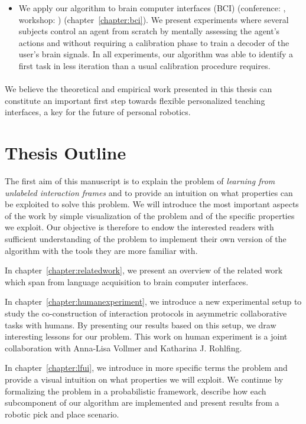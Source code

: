 \begin{itemize}
\item We apply our algorithm to brain computer interfaces (BCI) (conference: \cite{grizou2014calibration}, workshop: \cite{grizou2013zero}) (chapter~\ref{chapter:bci}). We present experiments where several subjects control an agent from scratch by mentally assessing the agent's actions and without requiring a calibration phase to train a decoder of the user's brain signals. In all experiments, our algorithm was able to identify a first task in less iteration than a usual calibration procedure requires.

\end{itemize}

\paragraph{} We believe the theoretical and empirical work presented in this thesis can constitute an important first step towards flexible personalized teaching interfaces, a key for the future of personal robotics.

\section{Thesis Outline}

The first aim of this manuscript is to explain the problem of \emph{learning from unlabeled interaction frames} and to provide an intuition on what properties can be exploited to solve this problem. We will introduce the most important aspects of the work by simple visualization of the problem and of the specific properties we exploit. Our objective is therefore to endow the interested readers with sufficient understanding of the problem to implement their own version of the algorithm with the tools they are more familiar with.

In chapter~\ref{chapter:relatedwork}, we present an overview of the related work which span from language acquisition to brain computer interfaces.

In chapter~\ref{chapter:humanexperiment}, we introduce a new experimental setup to study the co-construction of interaction protocols in asymmetric collaborative tasks with humans. By presenting our results based on this setup, we draw interesting lessons for our problem. This work on human experiment is a joint collaboration with Anna-Lisa Vollmer and Katharina J. Rohlfing.

In chapter~\ref{chapter:lfui}, we introduce in more specific terms the problem and provide a visual intuition on what properties we will exploit. We continue by formalizing the problem in a probabilistic framework, describe how each subcomponent of our algorithm are implemented and present results from a robotic pick and place scenario.

